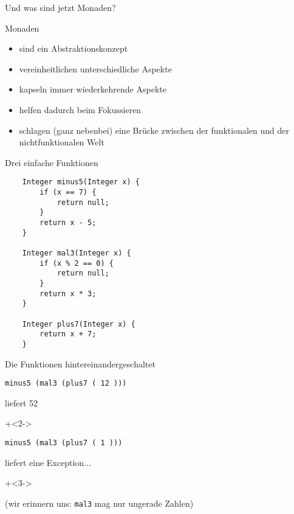 
\begin{frame}[fragile]{Und was sind jetzt Monaden?}

Monaden 
\begin{itemize}
\item sind ein Abstraktionskonzept
\item vereinheitlichen unterschiedliche Aspekte
\item kapseln immer wiederkehrende Aspekte
\item helfen dadurch beim Fokussieren
\item schlagen (ganz nebenbei) eine Brücke zwischen der funktionalen und der nichtfunktionalen Welt
\end{itemize}

\end{frame}


\begin{frame}[fragile]{Drei einfache Funktionen}
\begin{lstlisting}
    Integer minus5(Integer x) {
        if (x == 7) {
            return null;
        }
        return x - 5;
    }

    Integer mal3(Integer x) {
        if (x % 2 == 0) {
            return null;
        }
        return x * 3;
    }

    Integer plus7(Integer x) {
        return x + 7;
    }
\end{lstlisting}
\end{frame}

\begin{frame}[fragile]{Die Funktionen hintereinandergeschaltet}
\begin{lstlisting}
minus5 (mal3 (plus7 ( 12 )))
\end{lstlisting}

liefert 52

\onslide+<2->

\vspace{3em}

\begin{lstlisting}
minus5 (mal3 (plus7 ( 1 )))
\end{lstlisting}

liefert eine Exception...

\onslide+<3->
~

(wir erinnern uns: \lstinline|mal3| mag nur ungerade Zahlen)

\end{frame}

